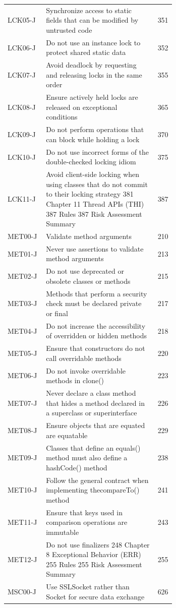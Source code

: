 \documentclass[11pt]{report}
\begin{document}
\begin{longtable}{@{}l>{\raggedright\arraybackslash}p{0.66\linewidth}r@{}}
LCK05-J & Synchronize access to static fields that can be modified by untrusted code & 351\\
LCK06-J & Do not use an instance lock to protect shared static data & 352\\
LCK07-J & Avoid deadlock by requesting and releasing locks in the same order & 355\\
LCK08-J & Ensure actively held locks are released on exceptional conditions & 365\\
LCK09-J & Do not perform operations that can block while holding a lock & 370\\
LCK10-J & Do not use incorrect forms of the double-checked locking idiom & 375\\
LCK11-J & Avoid client-side locking when using classes that do not commit to their locking strategy 381 Chapter 11 Thread APIs (THI) 387 Rules 387 Risk Assessment Summary & 387\\
MET00-J & Validate method arguments & 210\\
MET01-J & Never use assertions to validate method arguments & 213\\
MET02-J & Do not use deprecated or obsolete classes or methods & 215\\
MET03-J & Methods that perform a security check must be declared private or final & 217\\
MET04-J & Do not increase the accessibility of overridden or hidden methods & 218\\
MET05-J & Ensure that constructors do not call overridable methods & 220\\
MET06-J & Do not invoke overridable methods in clone() & 223\\
MET07-J & Never declare a class method that hides a method declared in a superclass or superinterface & 226\\
MET08-J & Ensure objects that are equated are equatable & 229\\
MET09-J & Classes that define an equals() method must also define a hashCode() method & 238\\
MET10-J & Follow the general contract when implementing thecompareTo() method & 241\\
MET11-J & Ensure that keys used in comparison operations are immutable & 243\\
MET12-J & Do not use finalizers 248 Chapter 8 Exceptional Behavior (ERR) 255 Rules 255 Risk Assessment Summary & 255\\
MSC00-J & Use SSLSocket rather than Socket for secure data exchange & 626\\

\end{longtable}
\end{document}
